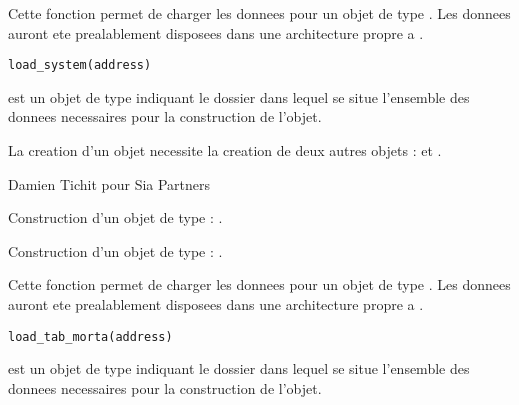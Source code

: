 \documentclass[a4paper]{book}
\begin{document}
%
\begin{Description}\relax
Cette fonction permet de charger les donnees pour un objet de type . Les donnees auront ete prealablement disposees dans
une architecture propre a .
\end{Description}
%
\begin{Usage}
\begin{verbatim}
load_system(address)
\end{verbatim}
\end{Usage}
%
\begin{Arguments}
\begin{ldescription}
\item[\code{address}] est un objet de type  indiquant le dossier dans lequel se situe l'ensemble des donnees necessaires
pour la construction de l'objet.
\end{ldescription}
\end{Arguments}
%
\begin{Details}\relax
La creation d'un objet  necessite la creation de deux autres objets :  et .
\end{Details}
%
\begin{Author}\relax
Damien Tichit pour Sia Partners
\end{Author}
%
\begin{SeeAlso}\relax
Construction d'un objet de type  : .

Construction d'un objet de type  : .
\end{SeeAlso}
%
\begin{Description}\relax
Cette fonction permet de charger les donnees pour un objet de type . Les donnees auront ete prealablement disposees dans
une architecture propre a .
\end{Description}
%
\begin{Usage}
\begin{verbatim}
load_tab_morta(address)
\end{verbatim}
\end{Usage}
%
\begin{Arguments}
\begin{ldescription}
\item[\code{address}] est un objet de type  indiquant le dossier dans lequel se situe l'ensemble des donnees necessaires
pour la construction de l'objet.
\end{ldescription}
\end{Arguments}
\end{document}
